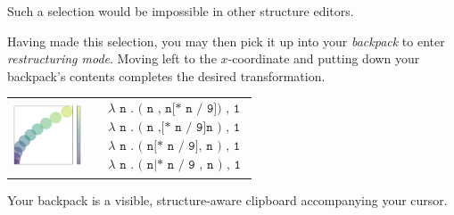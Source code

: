 \noindent
Such a selection would be impossible in other structure editors.

Having made this selection, you may then pick it up
into your \emph{backpack} to enter \emph{restructuring mode}.
Moving left to the $x$-coordinate and putting down
your backpack's contents completes the desired transformation.

\noindent
\begin{tabular}{cp{7cm}}
\includegraphics[width=2cm]{img/circles-parabola-transpose.png}
&
{
\begin{align*}
  & \texttt{$\lambda$ n . ( n , n[* n / 9]) , 1} \\
  & \texttt{$\lambda$ n . ( n ,[* n / 9]n ) , 1} \\
  & \texttt{$\lambda$ n . ( n[* n / 9], n ) , 1} \\
  & \texttt{$\lambda$ n . ( n|* n / 9 , n ) , 1}
\end{align*}
}
\end{tabular}
Your backpack is a visible, structure-aware clipboard
accompanying your cursor.


